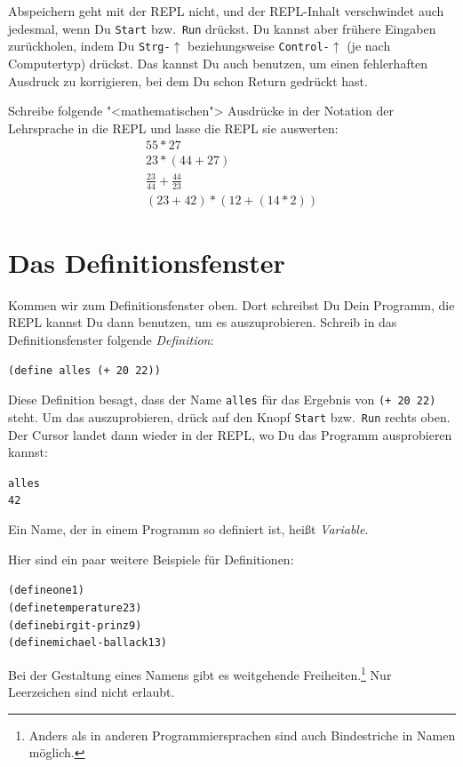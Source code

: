 Abspeichern geht mit der REPL nicht, und der REPL-Inhalt verschwindet
auch jedesmal, wenn Du \texttt{Start} bzw.\ \texttt{Run} drückst.  Du
kannst aber frühere Eingaben zurückholen, indem Du
\texttt{Strg-$\uparrow$} beziehungsweise \texttt{Control-$\uparrow$}
(je nach Computertyp) drückst.  Das kannst Du auch benutzen, um einen
fehlerhaften Ausdruck zu korrigieren, bei dem Du schon Return gedrückt hast.

\begin{aufgabe}
  Schreibe folgende "<mathematischen"> Ausdrücke in der Notation der
  Lehrsprache in die REPL und lasse die REPL sie auswerten:
  \begin{displaymath}
    \begin{array}{c}
      55 * 27\\
      23 * (44 + 27)\\
      \frac{23}{44} + \frac{44}{23}\\
      (23 + 42) * (12 + (14 * 2))
    \end{array}
  \end{displaymath}
\end{aufgabe}
%
\section{Das Definitionsfenster}

Kommen wir zum Definitionsfenster oben.  Dort schreibst Du Dein
Programm, die REPL kannst Du dann benutzen, um es auszuprobieren.
Schreib in das Definitionsfenster folgende
\textit{Definition}:
%
\begin{verbatim}
(define alles (+ 20 22))
\end{verbatim}
%
Diese Definition besagt, dass der Name \texttt{alles} für das Ergebnis
von \texttt{(+ 20 22)} steht.  Um das auszuprobieren, drück auf den
Knopf \texttt{Start} bzw.\ \texttt{Run} rechts oben.  Der Cursor
landet dann wieder in der REPL, wo Du das Programm ausprobieren
kannst:
%
\begin{alltt}
alles
\evalsto{} 42
\end{alltt}
%
Ein Name, der in einem Programm so definiert ist, heißt
\textit{Variable}.

Hier sind ein paar weitere Beispiele für Definitionen:
%
\begin{alltt}
(define one 1)
(define temperature 23)
(define birgit-prinz 9)
(define michael-ballack 13)
\end{alltt}
%
Bei der Gestaltung eines Namens gibt es weitgehende
Freiheiten.\footnote{Anders als in anderen Programmiersprachen sind
  auch Bindestriche in Namen möglich.}  Nur Leerzeichen sind nicht
erlaubt.

